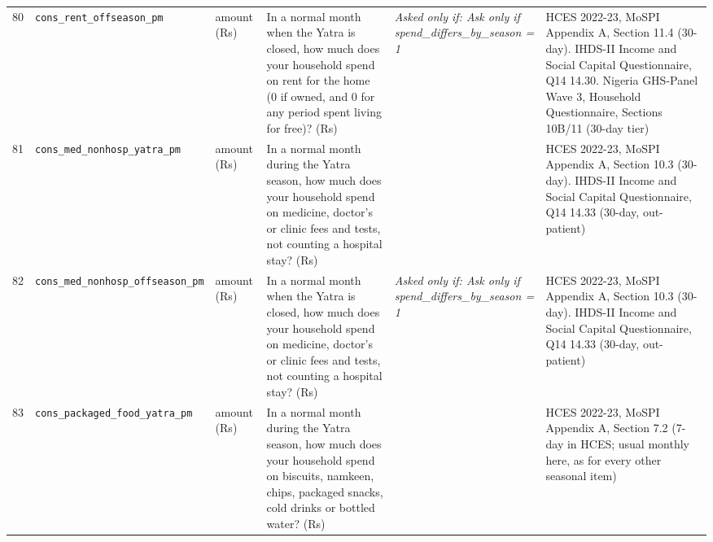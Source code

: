 \documentclass[9pt,a4paper,landscape]{article}
\begin{document}
\begin{longtable}{@{}p{0.5cm}p{3.3cm}p{1.7cm}p{7.3cm}p{5.6cm}p{5.4cm}@{}}
\footnotesize 80 & \footnotesize\texttt{cons\_rent\_offseason\_pm} & \scriptsize amount (Rs) & \footnotesize In a normal month when the Yatra is closed, how much does your household spend on rent for the home (0 if owned, and 0 for any period spent living for free)? (Rs)\par\vspace{1pt}{\footnotesize\color{hdr}{\hifont जब यात्रा बंद रहती है, उस आम महीने में आपका घर घर के किराये पर (अपना घर हो तो 0, और मुफ़्त रहे हों तो भी 0) कितना ख़र्च करता है? (रुपये)}} & \scriptsize \textit{Asked only if: Ask only if spend\_differs\_by\_season = 1} & \scriptsize HCES 2022-23, MoSPI Appendix A, Section 11.4 (30-day). IHDS-II Income and Social Capital Questionnaire, Q14 14.30. Nigeria GHS-Panel Wave 3, Household Questionnaire, Sections 10B/11 (30-day tier)\\
\footnotesize 81 & \footnotesize\texttt{cons\_med\_nonhosp\_yatra\_pm} & \scriptsize amount (Rs) & \footnotesize In a normal month during the Yatra season, how much does your household spend on medicine, doctor's or clinic fees and tests, not counting a hospital stay? (Rs)\par\vspace{1pt}{\footnotesize\color{hdr}{\hifont यात्रा के मौसम के आम महीने में, आप (और जो यहाँ आपके साथ रहते हैं) दवाई, डॉक्टर या क्लीनिक की फ़ीस और जाँच पर, अस्पताल में भर्ती को छोड़कर कितना ख़र्च करते हैं? (रुपये)}} & \scriptsize  & \scriptsize HCES 2022-23, MoSPI Appendix A, Section 10.3 (30-day). IHDS-II Income and Social Capital Questionnaire, Q14 14.33 (30-day, out-patient)\\
\footnotesize 82 & \footnotesize\texttt{cons\_med\_nonhosp\_offseason\_pm} & \scriptsize amount (Rs) & \footnotesize In a normal month when the Yatra is closed, how much does your household spend on medicine, doctor's or clinic fees and tests, not counting a hospital stay? (Rs)\par\vspace{1pt}{\footnotesize\color{hdr}{\hifont जब यात्रा बंद रहती है, उस आम महीने में आपका घर दवाई, डॉक्टर या क्लीनिक की फ़ीस और जाँच पर, अस्पताल में भर्ती को छोड़कर कितना ख़र्च करता है? (रुपये)}} & \scriptsize \textit{Asked only if: Ask only if spend\_differs\_by\_season = 1} & \scriptsize HCES 2022-23, MoSPI Appendix A, Section 10.3 (30-day). IHDS-II Income and Social Capital Questionnaire, Q14 14.33 (30-day, out-patient)\\
\footnotesize 83 & \footnotesize\texttt{cons\_packaged\_food\_yatra\_pm} & \scriptsize amount (Rs) & \footnotesize In a normal month during the Yatra season, how much does your household spend on biscuits, namkeen, chips, packaged snacks, cold drinks or bottled water? (Rs)\par\vspace{1pt}{\footnotesize\color{hdr}{\hifont यात्रा के मौसम के आम महीने में, आप (और जो यहाँ आपके साथ रहते हैं) बिस्किट, नमकीन, चिप्स, पैकेट वाले नाश्ते, कोल्ड ड्रिंक या बोतलबंद पानी पर कितना ख़र्च करते हैं? (रुपये)}} & \scriptsize  & \scriptsize HCES 2022-23, MoSPI Appendix A, Section 7.2 (7-day in HCES; usual monthly here, as for every other seasonal item)\\

\end{longtable}
\end{document}
